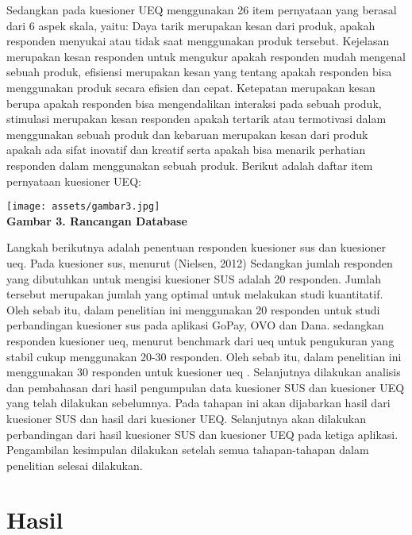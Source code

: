 \documentclass[
 manuscript=article,  %
  layout=publish, 
  year=2024, 
  month= Februari, %
  volume=8,
  number=1 
]{JIKO}
\begin{document}
Sedangkan pada kuesioner UEQ menggunakan 26 item pernyataan yang berasal dari 6 aspek skala, yaitu: Daya tarik merupakan kesan dari produk, apakah responden menyukai atau tidak saat menggunakan produk tersebut. Kejelasan merupakan kesan responden untuk mengukur apakah responden mudah mengenal sebuah produk, efisiensi merupakan kesan yang tentang apakah responden bisa menggunakan produk secara efisien dan cepat. Ketepatan merupakan kesan berupa apakah responden bisa mengendalikan interaksi pada sebuah produk, stimulasi merupakan kesan responden apakah tertarik atau termotivasi dalam menggunakan sebuah produk dan kebaruan merupakan kesan dari produk apakah ada sifat inovatif dan kreatif serta apakah bisa menarik perhatian responden dalam menggunakan sebuah produk. Berikut adalah daftar item pernyataan kuesioner UEQ: 

\begin{center}
    \texttt{[image: assets/gambar3.jpg]}
    \\\textbf{Gambar 3. Rancangan Database}
\end{center}


Langkah berikutnya adalah penentuan responden kuesioner sus dan kuesioner ueq. Pada kuesioner sus, menurut (Nielsen, 2012) Sedangkan jumlah responden yang dibutuhkan untuk mengisi kuesioner SUS adalah 20 responden. Jumlah tersebut merupakan jumlah yang optimal untuk melakukan studi kuantitatif. Oleh sebab itu, dalam penelitian ini menggunakan 20 responden untuk studi perbandingan kuesioner sus pada aplikasi GoPay, OVO dan Dana. sedangkan responden kuesioner ueq, menurut benchmark dari ueq untuk pengukuran yang stabil cukup menggunakan 20-30 responden. Oleh sebab itu, dalam penelitian ini menggunakan 30 responden untuk kuesioner ueq \cite{5}. 
Selanjutnya dilakukan analisis dan pembahasan dari hasil pengumpulan data kuesioner SUS dan kuesioner UEQ yang telah dilakukan sebelumnya. Pada tahapan ini akan dijabarkan hasil dari kuesioner SUS dan hasil dari kuesioner UEQ. Selanjutnya akan dilakukan perbandingan dari hasil kuesioner SUS dan kuesioner UEQ pada ketiga aplikasi. Pengambilan kesimpulan dilakukan setelah semua tahapan-tahapan dalam penelitian selesai dilakukan\cite{13}.

\section{Hasil}
\end{document}
